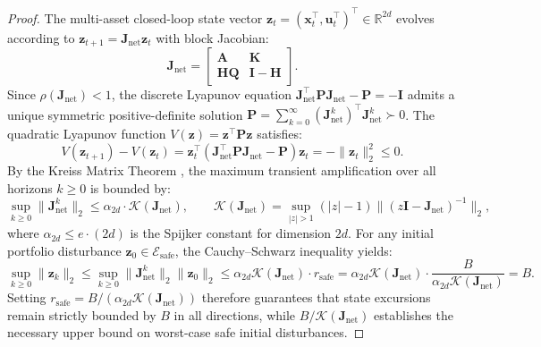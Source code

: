 \documentclass[11pt,a4paper]{article}
\theoremstyle{definition}\newtheorem{definition}[theorem]{Definition}
\theoremstyle{remark}\newtheorem{remark}[theorem]{Remark}
\begin{document}
\begin{proof}
The multi-asset closed-loop state vector $\mathbf{z}_t = (\mathbf{x}_t^\top, \mathbf{u}_t^\top)^\top \in \mathbb{R}^{2d}$ evolves according to $\mathbf{z}_{t+1} = \mathbf{J}_{\text{net}} \mathbf{z}_t$ with block Jacobian:
\begin{equation}
\mathbf{J}_{\text{net}} = \begin{bmatrix} \mathbf{A} & \mathbf{K} \\ \mathbf{H}\mathbf{Q} & \mathbf{I} - \mathbf{H} \end{bmatrix}.
\end{equation}
Since $\rho(\mathbf{J}_{\text{net}}) < 1$, the discrete Lyapunov equation $\mathbf{J}_{\text{net}}^\top \mathbf{P} \mathbf{J}_{\text{net}} - \mathbf{P} = -\mathbf{I}$ admits a unique symmetric positive-definite solution $\mathbf{P} = \sum_{k=0}^\infty (\mathbf{J}_{\text{net}}^k)^\top \mathbf{J}_{\text{net}}^k \succ 0$.
The quadratic Lyapunov function $V(\mathbf{z}) = \mathbf{z}^\top \mathbf{P} \mathbf{z}$ satisfies:
\begin{equation}
V(\mathbf{z}_{t+1}) - V(\mathbf{z}_t) = \mathbf{z}_t^\top (\mathbf{J}_{\text{net}}^\top \mathbf{P} \mathbf{J}_{\text{net}} - \mathbf{P}) \mathbf{z}_t = - \|\mathbf{z}_t\|_2^2 \le 0.
\end{equation}
By the Kreiss Matrix Theorem \cite{kreiss1962,spijker1991,trefethen2005spectra}, the maximum transient amplification over all horizons $k \ge 0$ is bounded by:
\begin{equation}
\sup_{k \ge 0} \|\mathbf{J}_{\text{net}}^k\|_2 \le \alpha_{2d} \cdot \mathcal{K}(\mathbf{J}_{\text{net}}), \qquad \mathcal{K}(\mathbf{J}_{\text{net}}) = \sup_{|z| > 1} (|z| - 1) \|(z\mathbf{I} - \mathbf{J}_{\text{net}})^{-1}\|_2,
\end{equation}
where $\alpha_{2d} \le e \cdot (2d)$ is the Spijker constant for dimension $2d$.
For any initial portfolio disturbance $\mathbf{z}_0 \in \mathcal{E}_{\text{safe}}$, the Cauchy--Schwarz inequality yields:
\begin{equation}
\sup_{k \ge 0} \|\mathbf{z}_k\|_2 \le \sup_{k \ge 0} \|\mathbf{J}_{\text{net}}^k\|_2 \|\mathbf{z}_0\|_2 \le \alpha_{2d} \mathcal{K}(\mathbf{J}_{\text{net}}) \cdot r_{\text{safe}} = \alpha_{2d} \mathcal{K}(\mathbf{J}_{\text{net}}) \cdot \frac{B}{\alpha_{2d} \mathcal{K}(\mathbf{J}_{\text{net}})} = B.
\end{equation}
Setting $r_{\text{safe}} = B / (\alpha_{2d} \mathcal{K}(\mathbf{J}_{\text{net}}))$ therefore guarantees that state excursions remain strictly bounded by $B$ in all directions, while $B / \mathcal{K}(\mathbf{J}_{\text{net}})$ establishes the necessary upper bound on worst-case safe initial disturbances.


\end{proof}
\end{document}
